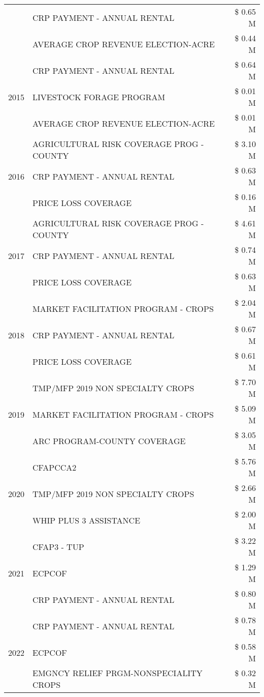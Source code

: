 \begin{tabular}{llr}
 & CRP PAYMENT - ANNUAL RENTAL & \$ 0.65 M \\
 & AVERAGE CROP REVENUE ELECTION-ACRE & \$ 0.44 M \\
\cline{1-3}
\multirow[t]{3}{*}{2015} & CRP PAYMENT - ANNUAL RENTAL & \$ 0.64 M \\
 & LIVESTOCK FORAGE PROGRAM & \$ 0.01 M \\
 & AVERAGE CROP REVENUE ELECTION-ACRE & \$ 0.01 M \\
\cline{1-3}
\multirow[t]{3}{*}{2016} & AGRICULTURAL RISK COVERAGE PROG - COUNTY & \$ 3.10 M \\
 & CRP PAYMENT - ANNUAL RENTAL & \$ 0.63 M \\
 & PRICE LOSS COVERAGE & \$ 0.16 M \\
\cline{1-3}
\multirow[t]{3}{*}{2017} & AGRICULTURAL RISK COVERAGE PROG - COUNTY & \$ 4.61 M \\
 & CRP PAYMENT - ANNUAL RENTAL & \$ 0.74 M \\
 & PRICE LOSS COVERAGE & \$ 0.63 M \\
\cline{1-3}
\multirow[t]{3}{*}{2018} & MARKET FACILITATION PROGRAM - CROPS & \$ 2.04 M \\
 & CRP PAYMENT - ANNUAL RENTAL & \$ 0.67 M \\
 & PRICE LOSS COVERAGE & \$ 0.61 M \\
\cline{1-3}
\multirow[t]{3}{*}{2019} & TMP/MFP 2019 NON SPECIALTY CROPS & \$ 7.70 M \\
 & MARKET FACILITATION PROGRAM - CROPS & \$ 5.09 M \\
 & ARC PROGRAM-COUNTY COVERAGE & \$ 3.05 M \\
\cline{1-3}
\multirow[t]{3}{*}{2020} & CFAPCCA2 & \$ 5.76 M \\
 & TMP/MFP 2019 NON SPECIALTY CROPS & \$ 2.66 M \\
 & WHIP PLUS 3 ASSISTANCE & \$ 2.00 M \\
\cline{1-3}
\multirow[t]{3}{*}{2021} & CFAP3 - TUP & \$ 3.22 M \\
 & ECPCOF & \$ 1.29 M \\
 & CRP PAYMENT - ANNUAL RENTAL & \$ 0.80 M \\
\cline{1-3}
\multirow[t]{3}{*}{2022} & CRP PAYMENT - ANNUAL RENTAL & \$ 0.78 M \\
 & ECPCOF & \$ 0.58 M \\
 & EMGNCY RELIEF PRGM-NONSPECIALITY CROPS & \$ 0.32 M \\
\cline{1-3}
\bottomrule
\end{tabular}
